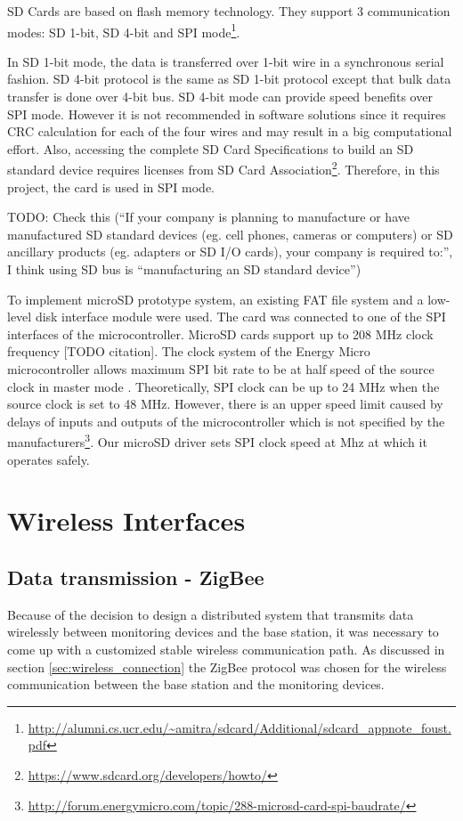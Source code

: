 SD Cards are based on flash memory technology. They support 3 communication modes: SD 1-bit, SD 4-bit and SPI mode\footnote{\url{http://alumni.cs.ucr.edu/~amitra/sdcard/Additional/sdcard_appnote_foust.pdf}}. 

In SD 1-bit mode, the data is transferred over 1-bit wire in a synchronous serial fashion. SD 4-bit protocol is the same as SD 1-bit protocol except that bulk data transfer is done over 4-bit bus. SD 4-bit mode can provide speed benefits over SPI mode. However it is not recommended in software solutions since it requires CRC calculation for each of the four wires and may result in a big computational effort. Also, accessing the complete SD Card Specifications to build an SD standard device requires licenses from SD Card Association\footnote{\url{https://www.sdcard.org/developers/howto/}}. Therefore, in this project, the card is used in SPI mode. 

TODO: Check this (“If your company is planning to manufacture or have manufactured SD standard devices  (eg. cell phones, cameras or computers) or SD ancillary products (eg. adapters or SD I/O cards), your company is required to:”, I think using SD bus is “manufacturing an SD standard device”)

To implement microSD prototype system, an existing FAT file system and a low-level disk interface module were used. The card was connected to one of the SPI interfaces of the microcontroller. MicroSD cards support up to 208 MHz clock frequency [TODO citation]. The clock system of the Energy Micro microcontroller allows maximum SPI bit rate to be at half speed of the source clock in master mode . Theoretically, SPI clock can be up to 24 MHz when the source clock is set to 48 MHz. However, there is an upper speed limit caused by delays of inputs and outputs of the microcontroller which is not specified by the manufacturers\footnote{\url{http://forum.energymicro.com/topic/288-microsd-card-spi-baudrate/}}. Our microSD driver sets SPI clock speed at  Mhz at which it operates safely.   


\section{Wireless Interfaces}
\subsection{Data transmission - ZigBee}
Because of the decision to design a distributed system that transmits data wirelessly between monitoring devices and the base station, it was necessary to come up with a customized stable wireless communication path. As discussed in section \ref{sec:wireless_connection} the ZigBee protocol was chosen for the wireless communication between the base station and the monitoring devices.

